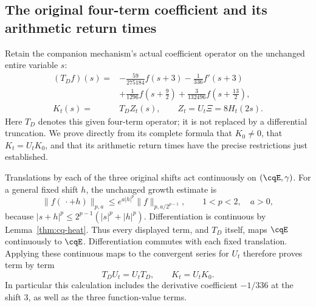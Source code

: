 \subsection{The original four-term coefficient and its arithmetic return times}
\label{sec:cq-xi4-heat-returns}
Retain the companion mechanism's actual coefficient operator
on the unchanged entire variable $s$:
\begin{equation}\label{eq:cq-xi4-original-operator}
 \begin{aligned}
 (T_Df)(s)={}&-\frac{59}{275184}f(s+3)
             -\frac1{336}f'(s+3)\\
            &+\frac1{1296}f(s+\tfrac92)
             +\frac3{132496}f(s+\tfrac{13}2),\\
 K_t(s)={}&T_DZ_t(s),\qquad Z_t=U_t\Xi=8H_t(2s).
 \end{aligned}
\end{equation}
Here $T_D$ denotes this given four-term operator; it is not
replaced by a differential truncation. We prove directly from
its complete formula that $K_0\ne0$, that $K_t=U_tK_0$,
and that its arithmetic return times have the precise restrictions
just established.

Translations by each of the three original shifts act
continuously on $(\cqE,\gamma)$. For a general fixed shift $h$,
the unchanged growth estimate is
\[
 \|f(\,\cdot+h)\|_{p,a}
 \leq e^{a|h|^p}\|f\|_{p,a/2^{p-1}},
 \qquad 1<p<2,\quad a>0,
\]
because $|s+h|^p\leq2^{p-1}(|s|^p+|h|^p)$.
Differentiation is continuous by Lemma~\ref{thm:cq-heat}.
Thus every displayed term, and $T_D$ itself, maps $\cqE$
continuously to $\cqE$. Differentiation commutes with each
fixed translation. Applying these continuous maps to the
convergent series for $U_t$ therefore proves term by term
\begin{equation}\label{eq:cq-xi4-heat-intertwiner}
 T_DU_t=U_tT_D,\qquad K_t=U_tK_0.
\end{equation}
In particular this calculation includes the derivative coefficient
$-1/336$ at the shift $3$, as well as the three function-value terms.

